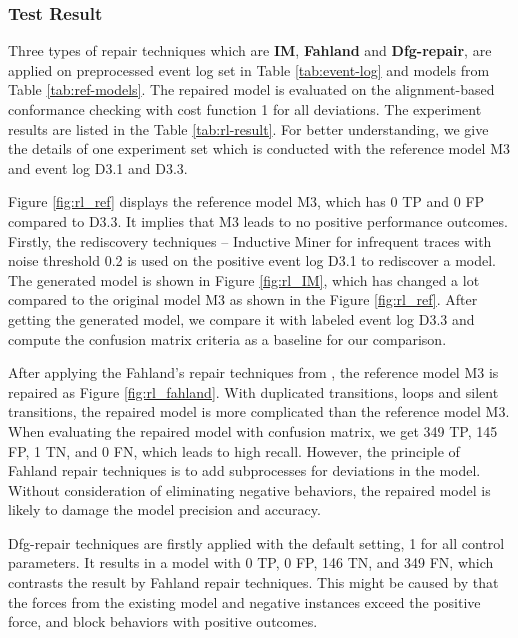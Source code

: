 \subsubsection{Test Result}
Three types of repair techniques which are \textbf{IM}, \textbf{Fahland} and \textbf{Dfg-repair}, are applied on preprocessed event log set in Table \ref{tab:event-log} and models from Table \ref{tab:ref-models}. The repaired model is evaluated on the alignment-based conformance checking with cost function 1 for all deviations. The experiment results are listed in the Table \ref{tab:rl-result}. For better understanding, we give the details of one experiment set which is conducted with the reference model M3 and event log D3.1 and D3.3.  

Figure \ref{fig:rl_ref} displays the reference model M3, which has 0 TP and 0 FP compared to D3.3. It implies that M3 leads to no positive performance outcomes. Firstly, the rediscovery techniques -- Inductive Miner for infrequent traces with noise threshold 0.2 is used on the positive event log D3.1 to rediscover a model. The generated model is shown in Figure \ref{fig:rl_IM}, which has changed a lot compared to the original model M3 as shown in the Figure \ref{fig:rl_ref}. After getting the generated model, we compare it with labeled event log D3.3 and compute the confusion matrix criteria as a baseline for our comparison. 

After applying the Fahland's repair techniques from \cite{fahland2015model}, the reference model M3 is repaired as Figure \ref{fig:rl_fahland}. With duplicated transitions, loops and silent transitions, the repaired model is more complicated than the reference model M3. When evaluating the repaired model with confusion matrix, we get 349 TP, 145 FP, 1 TN, and 0 FN, which leads to high recall. However, the principle of Fahland repair techniques is to add subprocesses for deviations in the model. Without consideration of eliminating negative behaviors, the repaired model is likely to damage the model precision and accuracy.

Dfg-repair techniques are firstly applied with the default setting, 1 for all control parameters. It results in a model with 0 TP, 0 FP, 146 TN, and 349 FN,  which contrasts the result by Fahland repair techniques. This might be caused by that the forces from the existing model and negative instances exceed the positive force, and block behaviors with positive outcomes. 

